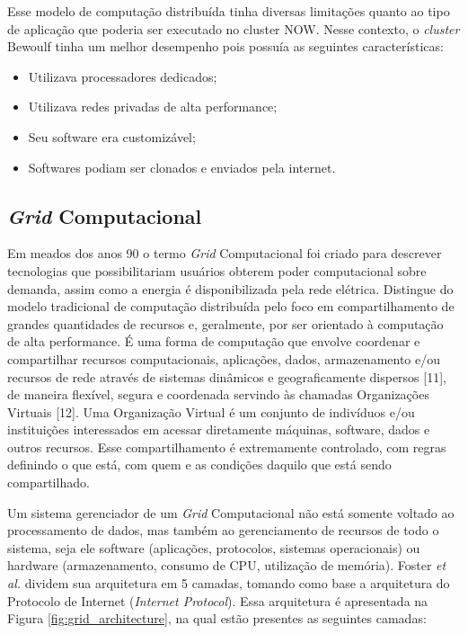 Esse modelo de computação distribuída tinha diversas limitações quanto ao tipo de aplicação que poderia ser executado no cluster NOW. Nesse contexto, o \textit{cluster} Bewoulf tinha um melhor desempenho pois possuía as seguintes características:

\begin{itemize}
    \item Utilizava processadores dedicados;
    \item Utilizava redes privadas de alta performance;
    \item Seu software era customizável;
    \item Softwares podiam ser clonados e enviados pela internet.
\end{itemize}

\subsection{\textit{Grid} Computacional} \label{cap2sec1subsec2}

Em meados dos anos 90 o termo \textit{Grid} Computacional foi criado para descrever tecnologias que possibilitariam usuários obterem poder computacional sobre demanda, assim como a energia é disponibilizada pela rede elétrica. Distingue do modelo tradicional de computação distribuída pelo foco em compartilhamento de grandes quantidades de recursos e, geralmente, por ser orientado à computação de alta performance. É uma forma de computação que envolve coordenar e compartilhar recursos computacionais, aplicações, dados, armazenamento e/ou recursos de rede através de sistemas dinâmicos e geograficamente dispersos [11], de maneira flexível, segura e coordenada servindo às chamadas Organizações Virtuais [12]. Uma Organização Virtual é um conjunto de indivíduos e/ou instituições interessados em acessar diretamente máquinas, software, dados e outros recursos. Esse compartilhamento é extremamente controlado, com regras definindo o que está, com quem e as condições daquilo que está sendo compartilhado.

Um sistema gerenciador de um \textit{Grid} Computacional não está somente voltado ao processamento de dados, mas também ao gerenciamento de recursos de todo o sistema, seja ele software (aplicações, protocolos, sistemas operacionais) ou hardware (armazenamento, consumo de CPU, utilização de memória). Foster \textit{et al.} \cite{cloud_360} dividem sua arquitetura em 5 camadas, tomando como base a arquitetura do Protocolo de Internet (\textit{Internet Protocol}). Essa arquitetura é apresentada na Figura \ref{fig:grid_architecture}, na qual estão presentes as seguintes camadas: 

